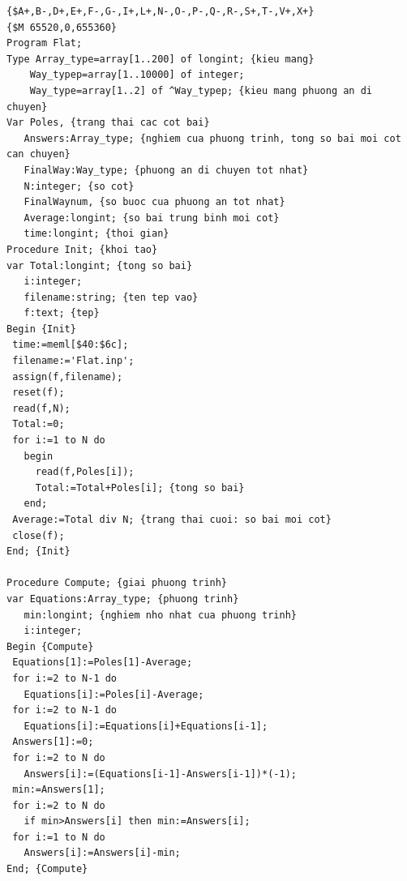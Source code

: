 \documentclass[11pt]{article}
\begin{document}
\begingroup
\scriptsize
\begin{verbatim}
{$A+,B-,D+,E+,F-,G-,I+,L+,N-,O-,P-,Q-,R-,S+,T-,V+,X+}
{$M 65520,0,655360}
Program Flat;
Type Array_type=array[1..200] of longint; {kieu mang}
    Way_typep=array[1..10000] of integer;
    Way_type=array[1..2] of ^Way_typep; {kieu mang phuong an di chuyen}
Var Poles, {trang thai cac cot bai}
   Answers:Array_type; {nghiem cua phuong trinh, tong so bai moi cot can chuyen}
   FinalWay:Way_type; {phuong an di chuyen tot nhat}
   N:integer; {so cot}
   FinalWaynum, {so buoc cua phuong an tot nhat}
   Average:longint; {so bai trung binh moi cot}
   time:longint; {thoi gian}
Procedure Init; {khoi tao}
var Total:longint; {tong so bai}
   i:integer;
   filename:string; {ten tep vao}
   f:text; {tep}
Begin {Init}
 time:=meml[$40:$6c];
 filename:='Flat.inp';
 assign(f,filename);
 reset(f);
 read(f,N);
 Total:=0;
 for i:=1 to N do
   begin
     read(f,Poles[i]);
     Total:=Total+Poles[i]; {tong so bai}
   end;
 Average:=Total div N; {trang thai cuoi: so bai moi cot}
 close(f);
End; {Init}

Procedure Compute; {giai phuong trinh}
var Equations:Array_type; {phuong trinh}
   min:longint; {nghiem nho nhat cua phuong trinh}
   i:integer;
Begin {Compute}
 Equations[1]:=Poles[1]-Average;
 for i:=2 to N-1 do
   Equations[i]:=Poles[i]-Average;
 for i:=2 to N-1 do
   Equations[i]:=Equations[i]+Equations[i-1];
 Answers[1]:=0;
 for i:=2 to N do
   Answers[i]:=(Equations[i-1]-Answers[i-1])*(-1);
 min:=Answers[1];
 for i:=2 to N do
   if min>Answers[i] then min:=Answers[i];
 for i:=1 to N do
   Answers[i]:=Answers[i]-min;
End; {Compute}


\end{verbatim}
\end{document}
